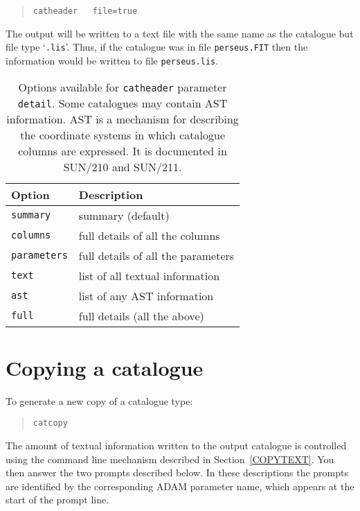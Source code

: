 \documentclass[twoside,11pt]{article}
\newcommand{\xref}[3]{#1}
\newcommand{\xlabel}[1]{}
\renewcommand{\_}{\texttt{\symbol{95}}}
\begin{document}
\begin{verse}
{\tt catheader ~ file=true}
\end{verse}

The output will be written to a text file with the same name as the
catalogue but file type `{\tt .lis}'.  Thus, if the catalogue was in file
{\tt perseus.FIT} then the information would be written to file
{\tt perseus.lis}.

\begin{table}[htbp]

\begin{center}
\begin{tabular}{ll}
Option           & Description \\ \hline
{\tt summary}    & summary (default) \\
{\tt columns}    & full details of all the columns\\
{\tt parameters} & full details of all the parameters\\
{\tt text}       & list of all textual information \\
{\tt ast}        & list of any AST information \\
{\tt full}       & full details (all the above) \\
\end{tabular}
\end{center}

\begin{quote}
\caption[Options available for {\tt catheader} parameter {\tt detail}]
{Options available for {\tt catheader} parameter {\tt detail}.  Some
catalogues may contain AST information.  AST is a mechanism for describing
the coordinate systems in which catalogue columns are expressed.  It is
documented in \xref{SUN/210}{sun210}{}\cite{SUN210} and
\xref{SUN/211}{sun211}{}\cite{SUN211}.
\label{HEADERDET} }
\end{quote}

\end{table}


\section{\xlabel{COPY}\label{COPY}Copying a catalogue}

To generate a new copy of a catalogue type:

\begin{verse}
{\tt catcopy}
\end{verse}

The amount of textual information written to the output catalogue is
controlled using the command line mechanism described in
Section~\ref{COPYTEXT}.  You then answer the two prompts described below.
In these descriptions the prompts are identified by the corresponding
ADAM parameter name, which appears at the start of the prompt line.
\end{document}
